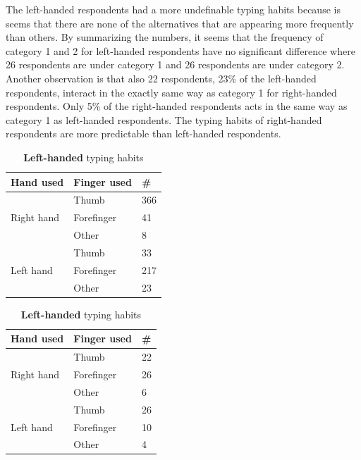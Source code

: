       The left-handed respondents had a more undefinable typing habits because is seems that there are none of the alternatives that are appearing more frequently than others. By summarizing the numbers, it seems that the frequency of category 1 and 2 for left-handed respondents have no significant difference where 26 respondents are under category 1 and 26 respondents are under category 2. Another observation is that also 22 respondents, 23\% of the left-handed respondents, interact in the exactly same way as category 1 for right-handed respondents. Only 5\% of the right-handed respondents acts in the same way as category 1 as left-handed respondents. The typing habits of right-handed respondents are more predictable than left-handed respondents. 

      \begin{table}[H]
        \parbox{.5\linewidth}{
          \centering
          \begin{tabular}{ l | l | l }
            \hline
            {\bf Hand used} & {\bf Finger used} & {\bf \#} \\ \hline
            \multirow{3}{*}{Right hand} & Thumb & 366 \\
            & Forefinger & 41 \\
            & Other & 8 \\ \hline
            \multirow{3}{*}{Left hand} & Thumb & 33 \\
            & Forefinger & 217 \\
            & Other & 23 \\ \hline
          \end{tabular}
          \caption{{\bf Right-handed} typing habits}
          \label{tab:righthandfinger}
        }
        \hfill
        \parbox{.5\linewidth}{
          \centering
          \begin{tabular}{ l | l | l }
            \hline
            {\bf Hand used} & {\bf Finger used} & {\bf \#} \\ \hline
            \multirow{3}{*}{Right hand} & Thumb & 22 \\ 
            & Forefinger & 26 \\
            & Other & 6 \\ \hline
            \multirow{3}{*}{Left hand} & Thumb & 26 \\ 
            & Forefinger & 10 \\
            & Other & 4 \\ \hline
          \end{tabular}
          \caption{{\bf Left-handed} typing habits}
          \label{tab:lefthandfinger}
        }
      \end{table}

